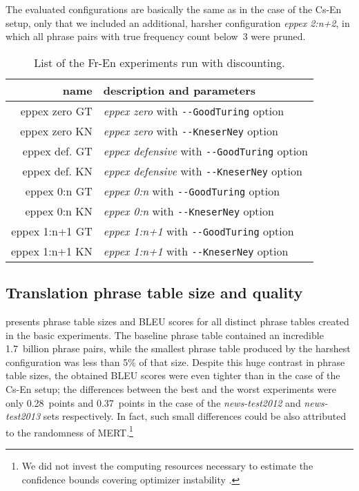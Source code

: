 The evaluated \eppex{} configurations are basically the same as in the case of the Cs-En setup,
only that we included an additional, harsher configuration \emph{eppex 2:n+2}, in which all phrase
pairs with true frequency count below~3 were pruned.

\begin{table}[ht]
\centering
\begin{tabular}{ r p{10cm} }
name & description and parameters \\
\hline
\hline
eppex zero GT & \emph{eppex zero} with \verb|--GoodTuring| option \\
eppex zero KN & \emph{eppex zero} with \verb|--KneserNey| option \\
eppex def. GT & \emph{eppex defensive} with \verb|--GoodTuring| option \\
eppex def. KN & \emph{eppex defensive} with \verb|--KneserNey| option \\
eppex 0:n GT  & \emph{eppex 0:n} with \verb|--GoodTuring| option \\
eppex 0:n KN  & \emph{eppex 0:n} with \verb|--KneserNey| option \\
eppex 1:n+1 GT & \emph{eppex 1:n+1} with \verb|--GoodTuring| option \\
eppex 1:n+1 KN & \emph{eppex 1:n+1} with \verb|--KneserNey| option \\
\hline
\hline
\end{tabular}
\caption{\label{fr-en-80-smoothed-scenarios}
List of the Fr-En experiments run with discounting.}
\end{table}

\subsection{Translation phrase table size and quality}

 presents phrase table sizes and BLEU scores for all
distinct phrase tables created in the basic experiments.
The baseline phrase table contained an incredible 1.7~billion phrase pairs,
while the smallest phrase table produced by the harshest \eppex{} configuration
was less than 5\% of that size.
Despite this huge contrast in phrase table sizes, the obtained BLEU scores
were even tighter than in the case of the Cs-En setup;
the differences between the best and the worst experiments were only 0.28~points
and 0.37~points in the case of the \emph{news-test2012} and \emph{news-test2013} sets
respectively.
In fact, such small differences could be also attributed to the randomness of
MERT.\footnote{We did not invest the computing resources necessary to estimate
the confidence bounds covering optimizer instability \citep{clark:optimizerinstability}.}

